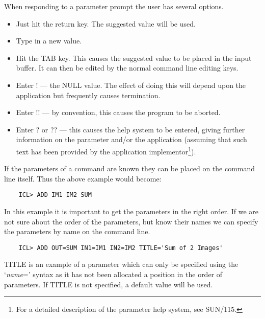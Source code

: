 \documentclass[twoside,11pt]{report}
\begin{document}
When responding to a parameter prompt the user has several options.
\begin{itemize}

\item Just hit the return key. The suggested value will be used.

\item Type in a new value.

\item Hit the TAB key. This causes the suggested value to be placed in the
input buffer. It can then be edited by the normal command line editing keys.
                                                                   
\item Enter ! --- the NULL value. The effect of doing this will depend upon
the application but frequently causes termination.

\item Enter !! --- by convention, this causes the program to be aborted.

\item Enter ? or ?? --- this causes the help system to be entered,
giving further information on the parameter and/or the application
(assuming that such text has been provided by the application 
implementor\footnote{For a detailed description of the parameter help system,
see SUN/115.}).
\end{itemize}                                                     

If the parameters of a command are known they can be placed on the command
line itself. Thus the above example would become:

\begin{verbatim}
    ICL> ADD IM1 IM2 SUM
\end{verbatim}

In this example it is important to get the parameters in the right order.
If we are not sure about the order of the parameters, but know their names
we can specify the parameters by name on the command line.

\begin{verbatim}
    ICL> ADD OUT=SUM IN1=IM1 IN2=IM2 TITLE='Sum of 2 Images'
\end{verbatim}

TITLE is an example of a parameter which can only be specified using the 
`{\em name}\/=' syntax as it has not been allocated a position in the order of
parameters.
If TITLE is not specified, a default value will be used.
\end{document}
